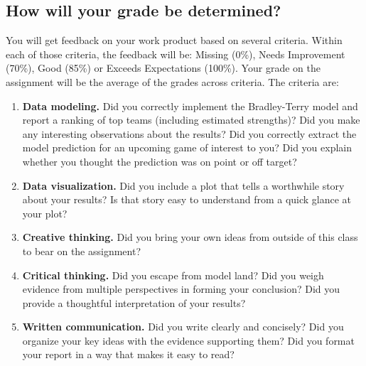 \documentclass{article}
\begin{document}
    \subsection*{\sc How will your grade be determined?}

      You will get feedback on your work product based on several criteria. Within each of those criteria, the feedback will be: Missing (0\%), Needs Improvement (70\%), Good (85\%) or Exceeds Expectations (100\%). Your grade on the assignment will be the average of the grades across criteria. The criteria are:
      \begin{enumerate}
        \item {\bf Data modeling.} Did you correctly implement the Bradley-Terry model and report a ranking of top teams (including estimated strengths)? Did you make any interesting observations about the results? Did you correctly extract the model prediction for an upcoming game of interest to you? Did you explain whether you thought the prediction was on point or off target?
        \item {\bf Data visualization.} Did you include a plot that tells a worthwhile story about your results? Is that story easy to understand from a quick glance at your plot?
        \item {\bf Creative thinking.} Did you bring your own ideas from outside of this class to bear on the assignment?
        \item {\bf Critical thinking.} Did you escape from model land? Did you weigh evidence from multiple perspectives in forming your conclusion? Did you provide a thoughtful interpretation of your results?
        \item {\bf Written communication.} Did you write clearly and concisely? Did you organize your key ideas with the evidence supporting them? Did you format your report in a way that makes it easy to read?
      \end{enumerate}
\end{document}
